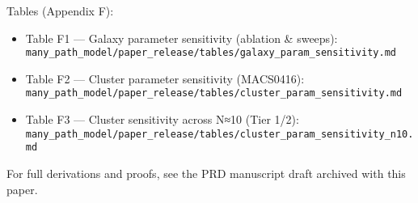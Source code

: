 \documentclass[11pt,a4paper]{article}
\begin{document}
Tables (Appendix F):

\begin{itemize}
\item Table F1 — Galaxy parameter sensitivity (ablation \& sweeps): \texttt{many\_path\_model/paper\_release/tables/galaxy\_param\_sensitivity.md}
\item Table F2 — Cluster parameter sensitivity (MACS0416): \texttt{many\_path\_model/paper\_release/tables/cluster\_param\_sensitivity.md}
\item Table F3 — Cluster sensitivity across N≈10 (Tier 1/2): \texttt{many\_path\_model/paper\_release/tables/cluster\_param\_sensitivity\_n10.md}
\end{itemize}


For full derivations and proofs, see the PRD manuscript draft archived with this paper.
\end{document}
